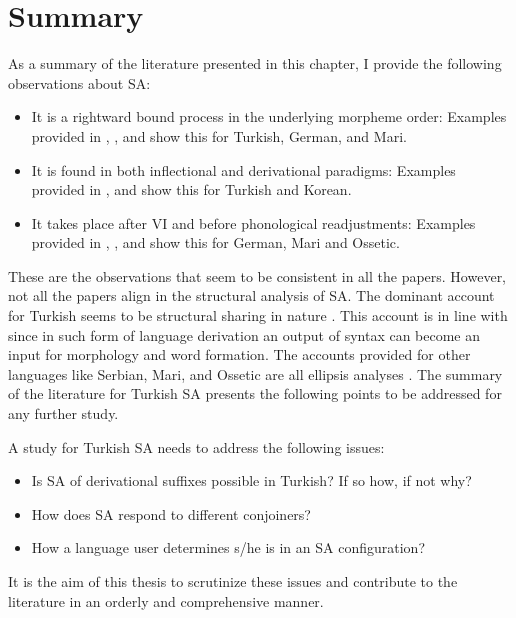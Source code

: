 \section{Summary}

As a summary of the literature presented in this chapter, I provide the following observations about SA:

\begin{itemize}
    \item It is a rightward bound process in the underlying morpheme order: Examples provided in \cite{kabak2007turkish}, \cite{pounder2006broken}, and \cite{guseva2017postsyntactic} show this for Turkish, German, and Mari.
    
    \item It is found in both inflectional and derivational paradigms: Examples provided in \cite{kabak2007turkish}, and \cite{yoon2017lexical} show this for Turkish and Korean.

    \item It takes place after VI and before phonological readjustments: Examples provided in  \cite{pounder2006broken}, \cite{guseva2017postsyntactic}, and \cite{erschler2018suspended} show this for German, Mari and Ossetic.
\end{itemize}

These are the observations that seem to be consistent in all the papers. However, not all the papers align in the structural analysis of SA. The dominant account for Turkish seems to be structural sharing in nature \citep{orgun1995flat,kornfilt1996some,broadwell2008turkish,kornfilt2012revisiting}. This account is in line with \cite{ackema2004beyond,kunduraci2016morphology, bruening2018word} since in such form of language derivation an output of syntax can become an input for morphology and word formation. The accounts provided for other languages like Serbian, Mari, and Ossetic are all ellipsis analyses \citep{despic2017suspended,guseva2017postsyntactic,erschler2018suspended}. The summary of the literature for Turkish SA presents the following points to be addressed for any further study.

A study for Turkish SA needs to address the following issues:

\begin{itemize}
    \item Is SA of derivational suffixes possible in Turkish? If so how, if not why?
    \item How  does SA respond to different conjoiners? 
    \item How a language user determines s/he is in an SA configuration?
\end{itemize}

It is the aim of this thesis to scrutinize these issues and contribute to the literature in an orderly and comprehensive manner.